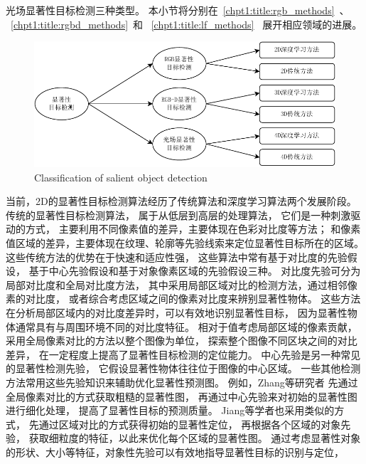 光场显著性目标检测三种类型。
本小节将分别在~\ref{chpt1:title:rgb_methods}~、
~\ref{chpt1:title:rgbd_methods}~和
~\ref{chpt1:title:lf_methods}~
展开相应领域的进展。
\begin{figure}[!ht]
	\centering
	\includegraphics[width=0.90\linewidth]{figures/chapter1/kinds}
	{Classification of salient object detection}  
	\label{chpt1:fig:kinds}
\end{figure}
\label{chpt1:title:rgb_methods}
%
%
当前，2D的显著性目标检测算法经历了传统算法和深度学习算法两个发展阶段。
传统的显著性目标检测算法，
属于从低层到高层的处理算法，
它们是一种刺激驱动的方式，
主要利用不同像素值的差异，主要体现在色彩对比度等方法；
和像素值区域的差异，主要体现在纹理、轮廓等先验线索来定位显著性目标所在的区域。
这些传统方法的优势在于快速和适应性强，
这些算法中常有基于对比度的先验假设，
基于中心先验假设和基于对象像素区域的先验假设三种。
对比度先验可分为局部对比度和全局对比度方法，
其中采用局部区域对比的检测方法，通过相邻像素的对比度，
或者综合考虑区域之间的像素对比度来辨别显著性物体。
这些方法在分析局部区域内的对比度差异时，可以有效地识别显著性目标，
因为显著性物体通常具有与周围环境不同的对比度特征。
相对于值考虑局部区域的像素贡献，
采用全局像素对比的方法以整个图像为单位，
探索整个图像不同区块之间的对比差异，
在一定程度上提高了显著性目标检测的定位能力。
中心先验是另一种常见的显著性检测先验，
它假设显著性物体往往位于图像的中心区域。
一些其他检测方法常用这些先验知识来辅助优化显著性预测图。
例如，Zhang等研究者
先通过全局像素对比的方式获取粗糙的显著性图，
再通过中心先验来对初始的显著性图进行细化处理，
提高了显著性目标的预测质量。
Jiang等学者也采用类似的方式，
先通过区域对比的方式获得初始的显著性定位，
再根据各个区域的对象先验，
获取细粒度的特征，以此来优化每个区域的显著性图。
通过考虑显著性对象的形状、大小等特征，对象性先验可以有效地指导显著性目标的识别与定位，
